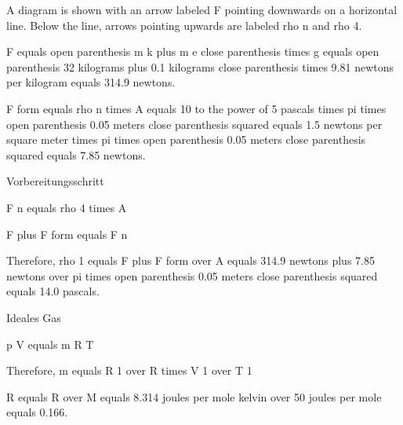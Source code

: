 A diagram is shown with an arrow labeled F pointing downwards on a horizontal line. Below the line, arrows pointing upwards are labeled rho n and rho 4.

F equals open parenthesis m k plus m e close parenthesis times g equals open parenthesis 32 kilograms plus 0.1 kilograms close parenthesis times 9.81 newtons per kilogram equals 314.9 newtons.

F form equals rho n times A equals 10 to the power of 5 pascals times pi times open parenthesis 0.05 meters close parenthesis squared equals 1.5 newtons per square meter times pi times open parenthesis 0.05 meters close parenthesis squared equals 7.85 newtons.

Vorbereitungsschritt

F n equals rho 4 times A

F plus F form equals F n

Therefore, rho 1 equals F plus F form over A equals 314.9 newtons plus 7.85 newtons over pi times open parenthesis 0.05 meters close parenthesis squared equals 14.0 pascals.

Ideales Gas

p V equals m R T

Therefore, m equals R 1 over R times V 1 over T 1

R equals R over M equals 8.314 joules per mole kelvin over 50 joules per mole equals 0.166.